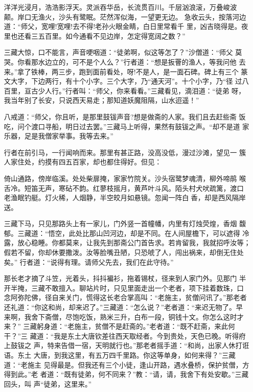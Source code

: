 洋洋光浸月，浩浩影浮天。灵派吞华岳，长流贯百川。千层汹浪滚，万叠峻波
颠。岸口无渔火，沙头有鹭眠。茫然浑似海，一望更无边。
急收云头，按落河边道：“师父，宽哩!宽哩!去不得!老孙火眼金睛，白日里常看千
里，凶吉晓得是。夜里也还看三五百里。如今通看不见边岸，怎定得宽阔之数？”

三藏大惊，口不能言，声音哽咽道：“徒弟啊，似这等怎了？”沙僧道：“师父
莫哭。你看那水边立的，可不是个人么？”行者道：“想是扳罾的渔人，等我问他
去来。”拿了铁棒，两三步，跑到面前看处，呀!不是人，是一面石碑。碑上有三个
篆文大字，下边两行，有十个小字。三个大字，乃“通天河”。十个小字，乃“径
过八百里，亘古少人行。”行者叫：“师父，你来看看。”三藏看见，滴泪道：“徒弟
呀，我当年别了长安，只说西天易走；那知道妖魔阻隔，山水迢遥！”

八戒道：“师父，你且听，是那里鼓钹声音?想是做斋的人家。我们且去赶些斋
饭吃，问个渡口寻船，明日过去罢。”三藏马上听得，果然有鼓钹之声。“却不是道
家乐器，足是我僧家举事。我等去来。”

行者在前引马，一行闻响而来。那里有甚正路，没高没低，漫过沙滩，望见一
簇人家住处，约摸有四五百家，却也都住得好。但见：

倚山通路，傍岸临溪。处处柴扉掩，家家竹院关。沙头宿鹭梦魂清，柳外啼鹃
喉舌冷。短笛无声，寒砧不韵。红蓼枝摇月，黄芦叶斗风。陌头村犬吠疏篱，渡口
老渔眠钓艇。灯火稀，人烟静，半空皎月如悬镜。忽闻一阵白香，却是西风隔岸
送。

三藏下马，只见那路头上有一家儿，门外竖一首幢幡，内里有灯烛荧煌，香烟
馥郁。三藏道：“悟空，此处比那山凹河边，却是不同。在人间屋檐下，可以遮得
冷露，放心稳睡。你都莫来，让我先到那斋公门首告求。若肯留我，我就招呼汝等；
假若不留，你却休要撒泼。汝等脸嘴丑陋，只恐唬了人，闯出祸来，却倒无住处矣。”
行者道：“说得有理。请师父先去，我们在此守待。”

那长老才摘了斗笠，光着头，抖抖褊衫，拖着锡杖，径来到人家门外。见那门
半开半掩，三藏不敢擅入。聊站片时，只见里面走出一个老者，项下挂着数珠，口
念阿弥陀佛，径自来关门，慌得这长老合掌高叫：“老施主，贫僧问讯了。”那老者
还礼道：“你这和尚，却来迟了。”三藏道：“怎么说？”老者道：“来迟无物了。早
来啊，我舍下斋僧，尽饱吃饭，熟米三升，白布一段，铜钱十文。你怎么这时才来？”
三藏躬身道：“老施主，贫僧不是赶斋的。”老者道：“既不赶斋，来此何干？”三
藏道：“我是东土大唐钦差往西天取经者。今到贵处，天色已晚。听得府上鼓钹之
声，特来告借一宿，天明就行也。”那老者摇手道：“和尚，出家人休打诳语。东土
大唐，到我这里，有五万四千里路。你这等单身，如何来得？”三藏道：“老施主
见得最是。但我还有三个小徒，逢山开路，遇水叠桥，保护贫僧，方得到此。”老
者道：“既有徒弟，何不同来？”教：“请，请，我舍下有处安歇。”三藏回头，叫
声“徒弟，这里来。”


